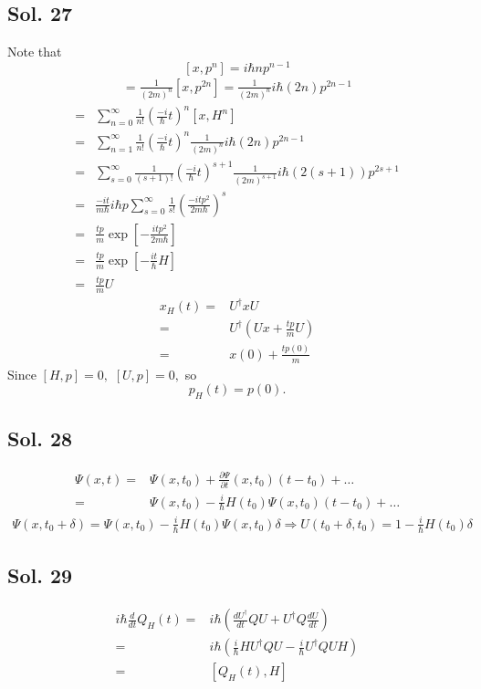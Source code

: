 \subsection*{Sol. 27}
Note that 
$$
[x,p^n]=i\hbar np^{n-1}
$$
\begin{align*}
    [x,H^n]=\frac{1}{(2m)^n}[x,p^{2n}]
    =\frac{1}{(2m)^n}i\hbar(2n)p^{2n-1}
\end{align*}
\begin{align*}
    [x,U]=&
    \sum_{n=0}^{\infty}\frac{1}{n!}(\frac{-i}{\hbar}t)^n
    [x,H^n]\\
    =&\sum_{n=1}^{\infty}\frac{1}{n!}(\frac{-i}{\hbar}t)^n\frac{1}{(2m)^n}i\hbar(2n)p^{2n-1}\\
    =&
    \sum_{s=0}^{\infty}\frac{1}{(s+1)!}(\frac{-i}{\hbar}t)^{s+1}\frac{1}{(2m)^{s+1}}i\hbar(2(s+1))p^{2s+1}\\
    =&\frac{-it}{m\hbar}i\hbar p
    \sum_{s=0}^\infty
    \frac{1}{s!}
    (\frac{-itp^2}{2m\hbar})^s\\
    =&
    \frac{tp}{m}
    \exp\left[
    -\frac{itp^2}{2m\hbar}
    \right]\\
    =&\frac{tp}{m}
    \exp\left[
    -\frac{it}{\hbar}H
    \right]\\
    =&\frac{tp}{m}U
\end{align*}
\begin{align*}
    x_H(t)=&U^\dagger xU\\
    =&U^\dagger(Ux + \frac{tp}{m}U)\\
    =&x(0) + \frac{tp(0)}{m}
\end{align*}
Since $[H,p]=0,$ $[U,p]=0,$ so 
$$
p_H(t) = p(0).
$$

\subsection*{Sol. 28}
\begin{align*}
    \Psi(x,t) =& \Psi(x,t_0) + \frac{\partial \Psi}{\partial t}(x,t_0)(t-t_0)+\dots\\
    =&\Psi(x,t_0) -\frac{i}{\hbar}H(t_0)\Psi(x,t_0)(t-t_0)+\dots
\end{align*}
\begin{align*}
    \Psi(x,t_0+\delta) = \Psi(x,t_0) -\frac{i}{\hbar}H(t_0)\Psi(x,t_0)\delta
    \Rightarrow U(t_0+\delta, t_0)=1-\frac{i}{\hbar}H(t_0)\delta
\end{align*}

\subsection*{Sol. 29}
\begin{align*}
    i\hbar \frac{d}{dt}Q_H(t)
    =&i\hbar(\frac{dU^\dagger}{dt}QU + U^\dagger Q\frac{dU}{dt})\\
    =&i\hbar (\frac{i}{\hbar} HU^\dagger QU -\frac{i}{\hbar}U^\dagger Q UH)\\
    =&[Q_H(t), H]
\end{align*}

